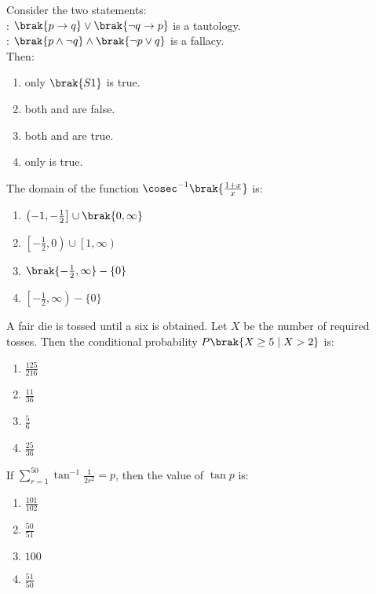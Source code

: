 \item Consider the two statements:\\
     : $\brak{p \rightarrow q} \lor \brak{\neg q \rightarrow p}$ is a tautology.\\
     : $\brak{p \land \neg q} \land \brak{\neg p \lor q}$ is a fallacy.\\
Then:  \hfill {}
\begin{multicols}{2}    
\begin{enumerate}
    \item only $\brak{S1}$ is true.
    \item both  and  are false.
    \item both  and  are true.
    \item only  is true.
\end{enumerate}
\end{multicols}


\item  The domain of the function $ \cosec^{-1} \brak{ \frac{1 + x}{x}} $ is: \hfill {}
\begin{multicols}{4}    
\begin{enumerate}
    \item $\left( -1, -\frac{1}{2} \right] \cup \brak{0, \infty}$
    \item $\left[-\frac{1}{2}, 0\right) \cup \left[1, \infty\right)$
    \item $\brak{-\frac{1}{2}, \infty } - \{0\}$
    \item $\left[ -\frac{1}{2}, \infty \right) - \{0\}$
\end{enumerate}
\end{multicols}


\item A fair die is tossed until a six is obtained. Let $X$ be the number of required tosses. Then the conditional probability $P\brak{X \geq 5 \mid X > 2}$ is: \hfill {}
\begin{multicols}{4}
\begin{enumerate}
    \item $\frac{125}{216}$
    \item $\frac{11}{36}$
    \item $\frac{5}{6}$
    \item $\frac{25}{36}$
\end{enumerate}
\end{multicols}


\item If $\sum_{r=1}^{50} \tan^{-1} \frac{1}{2r^2} = p$, then the value of $\tan p$ is:  \hfill {}
\begin{multicols}{4}    
\begin{enumerate}
    \item $\frac{101}{102}$
    \item $\frac{50}{51}$
    \item $100$
    \item $\frac{51}{50}$
\end{enumerate}
\end{multicols}


